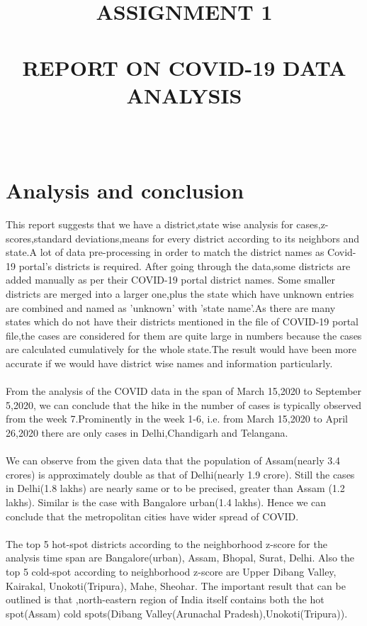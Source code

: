 \documentclass[paper=a4, fontsize=11pt]{scrartcl}
\title{
		\usefont{OT1}{bch}{b}{n}
		\normalfont \normalsize \textsc{ASSIGNMENT 1} \\ [25pt]
		\horrule{0.5pt} \\[0.4cm]
		\huge REPORT ON COVID-19 DATA ANALYSIS \\
		\horrule{2pt} \\[0.5cm]
}
\date{}
\numberwithin{equation}{section}		%
\numberwithin{figure}{section}			%
\numberwithin{table}{section}				%
\begin{document}
\maketitle
\section{Analysis and conclusion }
This report suggests that we have a district,state wise analysis for cases,z-scores,standard deviations,means for every district according to its neighbors and state.A lot of data pre-processing in order to match the district names as  Covid-19 portal's districts is required. After going through the data,some districts are added  manually as per their COVID-19 portal district names. Some smaller districts are merged into a larger one,plus the state which have unknown entries are combined  and named as 'unknown' with 'state name'.As there are many states which do not have their districts mentioned in the file of COVID-19 portal file,the cases are considered for them are quite large in numbers because the cases are calculated cumulatively for the whole state.The result would have been more accurate if we would have district wise names and information particularly. 
\paragraph{}
From the analysis of the COVID data in the span of March 15,2020 to September 5,2020, we can conclude that the hike in the number of cases is typically observed from the week 7.Prominently in the week 1-6, i.e. from March 15,2020 to April 26,2020 there are only cases in Delhi,Chandigarh and Telangana.
\paragraph{}
We can observe from the given data that the population of Assam(nearly 3.4 crores) is approximately double as that of Delhi(nearly 1.9 crore). Still the cases in Delhi(1.8 lakhs) are nearly same or to be precised, greater than Assam (1.2 lakhs). Similar is the case with Bangalore urban(1.4 lakhs). Hence we  can conclude that the metropolitan cities have wider spread of COVID. 
\paragraph{}
The top 5 hot-spot districts according to the neighborhood z-score for the analysis time span are Bangalore(urban), Assam, Bhopal, Surat, Delhi. Also the top 5 cold-spot according to neighborhood z-score are Upper Dibang Valley, Kairakal, Unokoti(Tripura), Mahe, Sheohar. The important result that can be outlined is that ,north-eastern region of India itself contains both the hot spot(Assam) cold spots(Dibang Valley(Arunachal Pradesh),Unokoti(Tripura)).  
\end{document}
